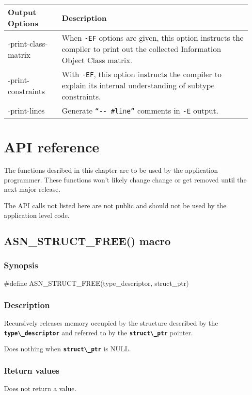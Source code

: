 \documentclass[english,oneside,12pt]{book}
\newcommand{\apisection}[2]{\clearpage\section{\label{#1}#2}}
\newcommand{\code}[1]{\texttt{\textbf{\lstinline{#1}}}}
\begin{document}
\begin{longtable}{lp{4in}}
\textbf{Output Options} & \textbf{Description}\\
\midrule
{\ttfamily -print-class-matrix} & {\small When \texttt{-EF} options are given, this option instructs the compiler to print out the collected Information Object Class matrix.}\\
{\ttfamily -print-constraints} & {\small With \texttt{-EF}, this option instructs the compiler
to explain its internal understanding of subtype constraints.}\\
{\ttfamily -print-lines} & {\small Generate \texttt{``-{}- \#line''} comments
in \texttt{-E} output.}\\
\end{longtable}
\renewcommand{\arraystretch}{1}


\chapter{API reference}

The functions desribed in this chapter are to be used by the application
programmer. These functions won't likely change change or get removed until
the next major release.

The API calls not listed here are not public and should not be used by the
application level code.

\apisection{sec:ASN_STRUCT_FREE}{ASN\_STRUCT\_FREE() macro}

\subsection*{Synopsis}

\begin{signature}
#define ASN_STRUCT_FREE(type_descriptor, struct_ptr)
\end{signature}

\subsection*{Description}

Recursively releases memory occupied by the structure
described by the \code{type\_descriptor} and referred to
by the \code{struct\_ptr} pointer.

Does nothing when \code{struct\_ptr} is NULL.

\subsection*{Return values}
Does not return a value.
\end{document}
